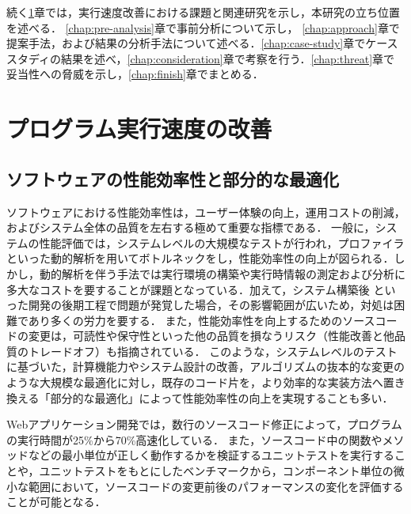 \documentclass[11pt]{jreport}
\newcommand{\todo}[1]{\colorbox{yellow}{{\bf TODO}:}{\color{red} {\textbf{[#1]}}}}
\begin{document}
続く\ref{chap:background}章では，実行速度改善における課題と関連研究を示し，本研究の立ち位置を述べる． \ref{chap:pre-analysis}章で事前分析について示し， \ref{chap:approach}章で提案手法，および結果の分析手法について述べる．\ref{chap:case-study}章でケーススタディの結果を述べ，\ref{chap:consideration}章で考察を行う．\ref{chap:threat}章で妥当性への脅威を示し，\ref{chap:finish}章でまとめる． 


\chapter{プログラム実行速度の改善}
\label{chap:background}

\section{ソフトウェアの性能効率性と部分的な最適化}

ソフトウェアにおける性能効率性は，ユーザー体験の向上，運用コストの削減，およびシステム全体の品質を左右する極めて重要な指標である．
一般に，システムの性能評価では，システムレベルの大規模なテストが行われ，プロファイラといった動的解析を用いてボトルネックをし，性能効率性の向上が図られる\cite{systemTest_large}．しかし，動的解析を伴う手法では実行環境の構築や実行時情報の測定および分析に多大なコストを要することが課題となっている\cite{systemTest_large, systemTest_workload}．加えて，システム構築後
といった開発の後期工程で問題が発覚した場合，その影響範囲が広いため，対処は困難であり多くの労力を要する\cite{local2system}．
また，性能効率性を向上するためのソースコードの変更は，可読性や保守性といった他の品質を損なうリスク（性能改善と他品質のトレードオフ）も指摘されている\cite{negative}．
このような，システムレベルのテストに基づいた，計算機能力やシステム設計の改善，アルゴリズムの抜本的な変更のような大規模な最適化に対し，既存のコード片を，より効率的な実装方法へ置き換える「部分的な最適化」によって性能効率性の向上を実現することも多い\cite{jsRefac, performance_aware_code_changes, JITProf, DrAsync}．

Webアプリケーション開発では，数行のソースコード修正によって，プログラムの実行時間が25\%から70\%高速化している\cite{jsRefac}．
また，ソースコード中の関数やメソッドなどの最小単位が正しく動作するかを検証するユニットテストを実行することや，ユニットテストをもとにしたベンチマークから，コンポーネント単位の微小な範囲において，ソースコードの変更前後のパフォーマンスの変化を評価することが可能となる\cite{test2benchmark, performanceRegression}．
\end{document}
